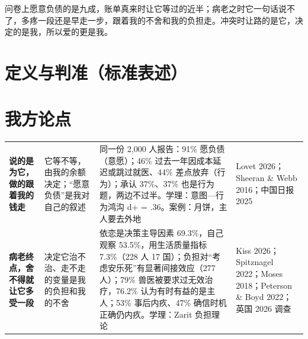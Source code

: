 \documentclass[quick,con]{debate}
\begin{document}
\debatetitle
\begin{thesisbox}[一句话立论]问卷上愿意负债的是九成，账单真来时让它等过的近半；病老之时它一句话说不了，多疼一段还是早走一步，跟着我的不舍和我的负担走。冲突时让路的是它，决定的是我，所以爱的更是我。\end{thesisbox}
\section{定义与判准（标准表述）}
\begin{fields}
\end{fields}
\section{我方论点}
\begin{tabularx}{\linewidth}{@{}L{5.5em}Y Y L{7em}@{}}\toprule
{}&&&\\\midrule
\textbf{说的是为它，做的跟着我的钱走}&它等不等，由我的余额决定；“愿意负债”是我对自己的叙述&同一份 2,000 人报告：91\% 愿负债（意愿）；46\% 过去一年因成本延迟或跳过就医、44\% 差点放弃（行为）；承认 37\%、37\% 也是行为题，两边不过半。学理：意图—行为鸿沟 d+ = .36。案例：月饼，主人要去外地&Lovet 2026；Sheeran \& Webb 2016；中国日报 2025\\
\textbf{病老终点，舍不得就让它多受一段}&决定它治不治、走不走的变量是我的负担和我的不舍&依恋是决策主导因素 69.3\%，自己观察 53.5\%，用生活质量指标 7.3\%（228 人 17 国）；负担对“考虑安乐死”有显著间接效应（277 人）；79\% 兽医被要求过无效治疗，76.2\% 认为有时有益的是主人；53\% 事后内疚、47\% 确信时机正确仍内疚。学理：Zarit 负担理论&Kiss 2026；Spitznagel 2022；Moses 2018；Peterson \& Boyd 2022；英国 2026 调查\\
\bottomrule\end{tabularx}
\end{document}
